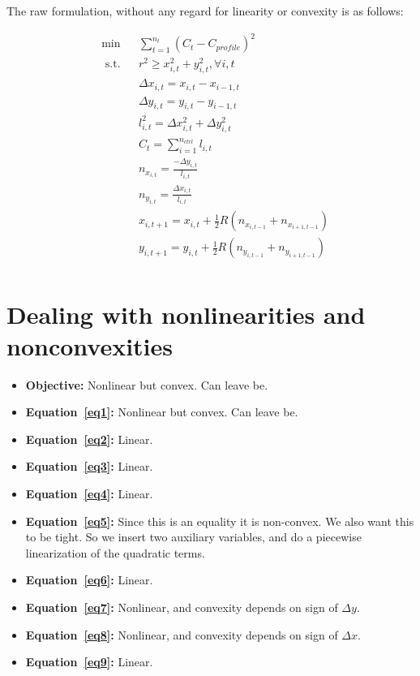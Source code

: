 \documentclass[12pt]{article}
\begin{document}
	The raw formulation, without any regard for linearity or convexity
	is as follows:
	
	\begin{align}
	& \min &&\sum_{t=1}^{n_t} (C_{t} - C_{profile})^2 \\
	& \text{ s.t.} && r^2 \geq x_{i,t}^2 + y_{i,t}^2, \forall i, t \label{eq1} \\
	& && \Delta x_{i,t} = x_{i,t} - x_{i-1,t} \label{eq2}\\
	& && \Delta y_{i,t} = y_{i,t} - y_{i-1,t} \label{eq3} \\
	& && l_{i,t}^2 = \Delta x_{i,t}^2 + \Delta y_{i,t}^2 \label{eq4} \\
	& && C_{t} = \sum\limits_{i=1}^{n_{ctrl}} l_{i,t} \label{eq5} \\
	& && n_{x_{i,t}} = \frac{-\Delta y_{i,t}}{l_{i,t}} \label{eq6} \\
	& && n_{y_{i,t}} = \frac{\Delta x_{i,t}}{l_{i,t}} \label{eq7} \\
	& && x_{i,t+1} = x_{i,t} + \frac{1}{2} R (n_{x_{i,t-1}}+ n_{x_{i+1,t-1}}) \label{eq8} \\ 
	& && y_{i,t+1} = y_{i,t} + \frac{1}{2} R (n_{y_{i,t-1}}+ n_{y_{i+1,t-1}}) \label{eq9} \\
	\end{align}
	
	\section{Dealing with nonlinearities and nonconvexities}
	\begin{itemize}
		\item \textbf{Objective:} Nonlinear but convex. Can leave be. 
		\item \textbf{Equation~\ref{eq1}:} Nonlinear but convex. Can leave be. 
		\item \textbf{Equation~\ref{eq2}:} Linear. 
		\item \textbf{Equation~\ref{eq3}:} Linear.
		\item \textbf{Equation~\ref{eq4}:} Linear.
		\item \textbf{Equation~\ref{eq5}:} Since this is an equality it is non-convex. We also want this to be tight. So we insert two auxiliary variables, and do a piecewise linearization of the quadratic terms.
		\item \textbf{Equation~\ref{eq6}:} Linear. 
		\item \textbf{Equation~\ref{eq7}:} Nonlinear, and convexity depends on sign of $\Delta y$. 
		\item \textbf{Equation~\ref{eq8}:} Nonlinear, and convexity depends on sign of $\Delta x$.
		\item \textbf{Equation~\ref{eq9}:} Linear. 

	\end{itemize}
	
\end{document}
